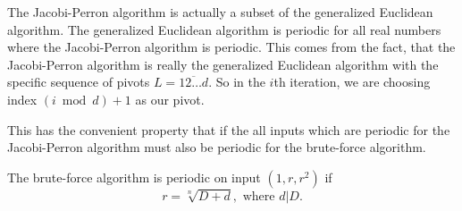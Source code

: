 The Jacobi-Perron algorithm is actually a subset of the generalized Euclidean
algorithm.
The generalized Euclidean algorithm is periodic for all real numbers where the
Jacobi-Perron algorithm is periodic.
This comes from the fact, that the Jacobi-Perron algorithm is really the
generalized Euclidean algorithm with the specific sequence of pivots $L = \overline{12…d}$.
So in the $i$th iteration, we are choosing index $(i \bmod d) + 1$ as our pivot.

This has the convenient property that if the all inputs which are periodic for
the Jacobi-Perron algorithm must also be periodic for the brute-force algorithm.

\begin{theorem}
  The brute-force algorithm is periodic on input $(1, r, r^2)$ if
  \[
    r = \sqrt[n]{D + d}, \text{ where } d | D.
  \]
\end{theorem}
